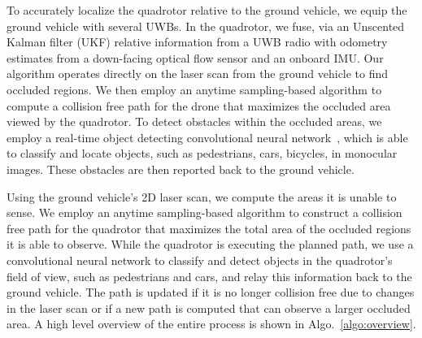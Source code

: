 To accurately localize the quadrotor relative to the ground vehicle, we equip the ground vehicle with several UWBs. In the quadrotor, we fuse, via an Unscented Kalman filter (UKF) relative information from a UWB radio with odometry estimates from a down-facing optical flow sensor and an onboard IMU.
Our algorithm operates directly on the laser scan from the ground vehicle to find occluded
regions.
We then employ an anytime sampling-based algorithm to compute a collision free path for the drone
that maximizes the occluded area viewed by the quadrotor.
To detect obstacles within the occluded areas, we employ a real-time object
detecting convolutional neural network~\cite{redmon2016you}, which is able to
classify and locate objects, such as pedestrians, cars, bicycles, in monocular
images.  These obstacles are then reported back to the ground vehicle.

%
%

Using the ground vehicle's 2D laser scan, we compute the areas it is unable to
sense. We employ an anytime sampling-based algorithm to construct a collision free 
path for the quadrotor that maximizes the total area of the occluded
regions it is able to observe. While the quadrotor is executing the planned
path, we use a convolutional neural network to classify and detect objects in
the quadrotor's field of view, such as pedestrians and cars, and relay this
information back to the ground vehicle. The path is updated if it is no longer
collision free due to changes in the laser scan or if a new path is computed
that can observe a larger occluded area. A high level overview of the entire
process is shown in Algo.~\ref{algo:overview}.

